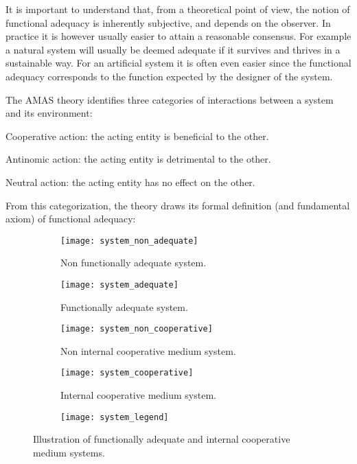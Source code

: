 It is important to understand that, from a theoretical point of view, the notion of functional adequacy is inherently subjective, and depends on the observer. In practice it is however usually easier to attain a reasonable consensus. For example a natural system will usually be deemed adequate if it survives and thrives in a sustainable way. For an artificial system it is often even easier since the functional adequacy corresponds to the function expected by the designer of the system.

The AMAS theory identifies three categories of interactions between a system and its environment:
\begin{compactitem}
\item Cooperative action: the acting entity is beneficial to the other.
\item Antinomic action: the acting entity is detrimental to the other.
\item Neutral action: the acting entity has no effect on the other.
\end{compactitem}

From this categorization, the theory draws its formal definition (and fundamental axiom) of functional adequacy:


\begin{figure}
\centering

	\begin{subfigure}[b]{0.45\textwidth}
		\centering
		\texttt{[image: system\_non\_adequate]}
		\caption{Non functionally adequate system.}\label{adequacy_comp_1}
	\end{subfigure}
	\begin{subfigure}[b]{0.45\textwidth}
		\centering
		\texttt{[image: system\_adequate]}
		\caption{Functionally adequate system.}\label{adequacy_comp_2}
	\end{subfigure}
	
	\begin{subfigure}[b]{0.45\textwidth}
		\centering
		\texttt{[image: system\_non\_cooperative]}
		\caption{Non internal cooperative medium system.}\label{internal_cooperative_comp_1}
	\end{subfigure}
	\begin{subfigure}[b]{0.45\textwidth}
		\centering
		\texttt{[image: system\_cooperative]}
		\caption{Internal cooperative medium system.}\label{internal_cooperative_comp_2}
	\end{subfigure}
	
	\begin{subfigure}[b]{0.7\textwidth}
		\centering
		\texttt{[image: system\_legend]}
	\end{subfigure}
	
\caption{Illustration of functionally adequate and internal cooperative medium systems.}
\label{adequacy_comp}
\end{figure}

